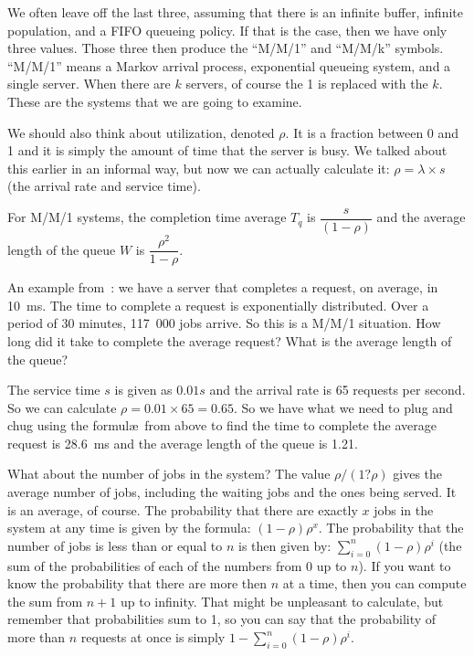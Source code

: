 \documentclass[a4paper]{report}
\begin{document}
We often leave off the last three, assuming that there is an infinite buffer, infinite population, and a FIFO queueing policy. If that is the case, then we have only three values. Those three then produce the ``M/M/1'' and ``M/M/k'' symbols. ``M/M/1'' means a Markov arrival process, exponential queueing system, and a single server. When there are $k$ servers, of course the 1 is replaced with the $k$. These are the systems that we are going to examine.

We should also think about utilization, denoted $\rho$. It is a fraction between 0 and 1 and it is simply the amount of time that the server is busy. We talked about this earlier in an informal way, but now we can actually calculate it: $\rho = \lambda \times s$ (the arrival rate and service time). 

For M/M/1 systems, the completion time average $T_{q}$ is $\dfrac{s}{(1-\rho)}$ and the average length of the queue $W$ is $\dfrac{\rho^{2}}{1-\rho}$.

An example from~\cite{williams-q}: we have a server that completes a request, on average, in 10~ms. The time to complete a request is exponentially distributed. Over a period of 30 minutes, 117~000 jobs arrive. So this is a M/M/1 situation. How long did it take to complete the average request? What is the average length of the queue?

The service time $s$ is given as $0.01s$ and the arrival rate is 65 requests per second. So we can calculate $\rho = 0.01 \times 65 = 0.65$. So we have what we need to plug and chug using the formul\ae\ from above to find the time to complete the average request is 28.6~ms and the average length of the queue is 1.21.

What about the number of jobs in the system? The value $\rho/(1 ? \rho)$ gives the average number of jobs, including the waiting jobs and the ones being served. It is an average, of course. The probability that there are exactly $x$ jobs in the system at any time is given by the formula: $(1-\rho)\rho^{x}$. The probability that the number of jobs is less than or equal to $n$ is then given by: $\sum\limits_{i=0}^{n}(1-\rho)\rho^{i}$ (the sum of the probabilities of each of the numbers from 0 up to $n$). If you want to know the probability that there are more then $n$ at a time, then you can compute the sum from $n+1$ up to infinity. That might be unpleasant to calculate, but remember that probabilities sum to 1, so you can say that the probability of more than $n$ requests at once is simply $1 - \sum\limits_{i=0}^{n}(1-\rho)\rho^{i}$.
\end{document}

